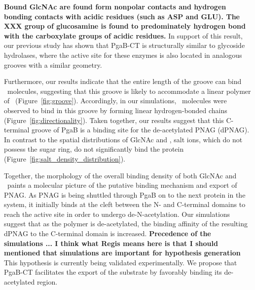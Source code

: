 \textbf{Bound GlcNAc are found form nonpolar contacts and hydrogen bonding contacts with acidic residues (such as ASP and GLU). The XXX group of glucosamine is found to predominately hydrogen bond with the carboxylate groups of acidic residues.} 
In support of this result, our previous study has shown that PgaB-CT is structurally similar to glycoside hydrolases,\cite{Little:2012dp} where the active site for these enzymes is also located in analogous grooves with a similar geometry. 

Furthermore, our results indicate that the entire length of the groove can bind \glucosamine\ molecules, suggesting that this groove is likely to accommodate a linear polymer of \glucosamine\ (Figure~\ref{fig:groove}). Accordingly, in our simulations, \glucosamine\ molecules were observed to bind in this groove by forming linear hydrogen-bonded chains (Figure~\ref{fig:directionality}). Taken together, our results suggest that this C-terminal groove of PgaB is a binding site for the de-acetylated PNAG (dPNAG). In contrast to the spatial distributions of GlcNAc and \glucosamine, salt ions, which do not possess the sugar ring, do not significantly bind the protein (Figure~\ref{fig:salt_density_distribution}).

Together, the morphology of the overall binding density of both GlcNAc and \glucosamine\ paints a molecular picture of the putative binding mechanism and export of PNAG. As PNAG is being shuttled through PgaB on to the next protein in the system, it initially binds at the cleft between the N- and C-terminal domains to reach the active site in order to undergo de-N-acetylation. Our simulations suggest that as the polymer is de-acetylated, the binding affinity of the resulting dPNAG to the C-terminal domain is increased. \textbf{Precedence of the simulations ... I think what Regis means here is that I should mentioned that simulations are important for hypothesis generation} This hypothesis is currently being validated experimentally. We propose that PgaB-CT facilitates the export of the substrate by favorably binding its de-acetylated region. 

 
